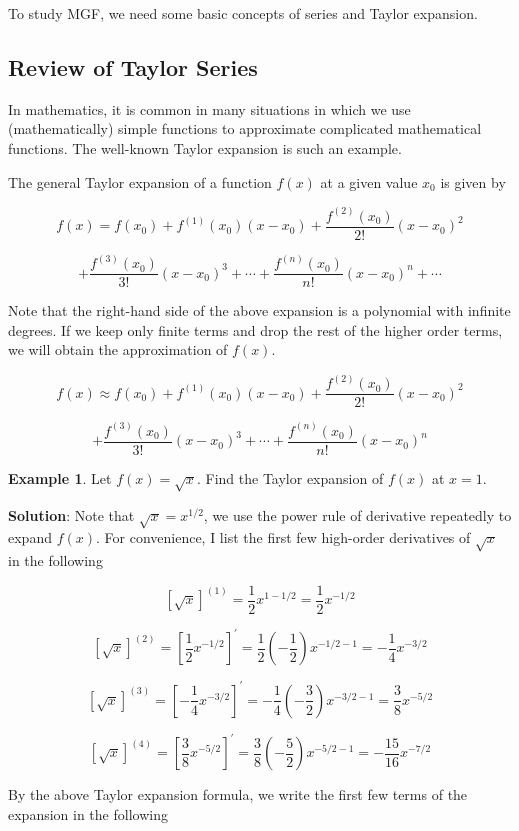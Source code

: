 \documentclass[
]{book}
\begin{document}
To study MGF, we need some basic concepts of series and Taylor expansion.

\hypertarget{review-of-taylor-series}{%
\subsection{Review of Taylor Series}\label{review-of-taylor-series}}

In mathematics, it is common in many situations in which we use (mathematically) simple functions to approximate complicated mathematical functions. The well-known Taylor expansion is such an example.

The general Taylor expansion of a function \(f(x)\) at a given value \(x_0\) is given by

\[
f(x) = f(x_0) + f^{(1)}(x_0)(x-x_0) + \frac{f^{(2)}(x_0)}{2!}(x-x_0)^2 
\]

\[
+ \frac{f^{(3)}(x_0)}{3!}(x-x_0)^3 + \cdots + \frac{f^{(n)}(x_0)}{n!}(x-x_0)^n +\cdots 
\]

Note that the right-hand side of the above expansion is a polynomial with infinite degrees. If we keep only finite terms and drop the rest of the higher order terms, we will obtain the approximation of \(f(x)\).

\[
f(x) \approx f(x_0) + f^{(1)}(x_0)(x-x_0) + \frac{f^{(2)}(x_0)}{2!}(x-x_0)^2
\]

\[
+ \frac{f^{(3)}(x_0)}{3!}(x-x_0)^3 + \cdots + \frac{f^{(n)}(x_0)}{n!}(x-x_0)^n 
\]

\textbf{Example 1}. Let \(f(x) = \sqrt{x}\). Find the Taylor expansion of \(f(x)\) at \(x = 1\).

\textbf{Solution}: Note that \(\sqrt{x} = x^{1/2}\), we use the power rule of derivative repeatedly to expand \(f(x)\). For convenience, I list the first few high-order derivatives of \(\sqrt{x}\) in the following

\[
[\sqrt{x}]^{(1)} = \frac{1}{2}x^{1-1/2} = \frac{1}{2}x^{-1/2}
\]

\[
[\sqrt{x}]^{(2)} =  [\frac{1}{2}x^{-1/2}]^\prime = \frac{1}{2}(-\frac{1}{2})x^{-1/2-1} = -\frac{1}{4}x^{-3/2}
\]

\[
[\sqrt{x}]^{(3)} = [-\frac{1}{4}x^{-3/2}]^\prime =-\frac{1}{4}(-\frac{3}{2})x^{-3/2-1} = \frac{3}{8}x^{-5/2}
\]

\[
[\sqrt{x}]^{(4)}  = [\frac{3}{8}x^{-5/2}]^\prime = \frac{3}{8}(-\frac{5}{2})x^{-5/2-1} = -\frac{15}{16}x^{-7/2}
\]

By the above Taylor expansion formula, we write the first few terms of the expansion in the following
\end{document}

